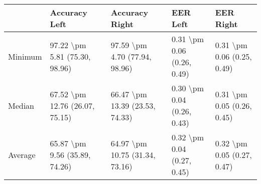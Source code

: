 \begin{tabular}{lllll}
\toprule
{} &                   Accuracy Left &                  Accuracy Right &                    EER Left &                   EER Right \\
\midrule
Minimum &   97.22 \textbackslash pm 5.81 (75.30, 98.96) &   97.59 \textbackslash pm 4.70 (77.94, 98.96) &  0.31 \textbackslash pm 0.06 (0.26, 0.49) &  0.31 \textbackslash pm 0.06 (0.25, 0.49) \\
Median  &  67.52 \textbackslash pm 12.76 (26.07, 75.15) &  66.47 \textbackslash pm 13.39 (23.53, 74.33) &  0.30 \textbackslash pm 0.04 (0.26, 0.43) &  0.31 \textbackslash pm 0.05 (0.26, 0.45) \\
Average &   65.87 \textbackslash pm 9.56 (35.89, 74.26) &  64.97 \textbackslash pm 10.75 (31.34, 73.16) &  0.32 \textbackslash pm 0.04 (0.27, 0.45) &  0.32 \textbackslash pm 0.05 (0.27, 0.47) \\
\bottomrule
\end{tabular}
